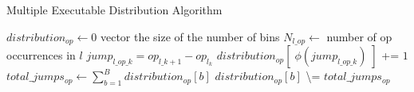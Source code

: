 
\begin{algorithm}
    \caption{Multiple Executable Distribution Algorithm}
    \begin{algorithmic}
            \STATE $distribution_{op} \gets 0$ vector the size of the number of bins
        \ENDFOR
                \STATE $N_{l\_op} \gets $ number of op occurrences in $l$
                    \STATE $jump_{l\_op\_k} = op_{l\_k+1} - op_{l_k}$
                    \STATE $distribution_{op}[\;\phi(jump_{l\_op\_k})\;]$ += $1$
                \ENDFOR
            \ENDFOR
        \ENDFOR
            \STATE $total\_jumps_{op} \gets \sum_{b=1}^B distribution_{op}[b]$
                \STATE $distribution_{op}[b]$ \textbackslash= $total\_jumps_{op}$
            \ENDFOR
        \ENDFOR
    \end{algorithmic}\label{alg:algorithm_multiple}
\end{algorithm}